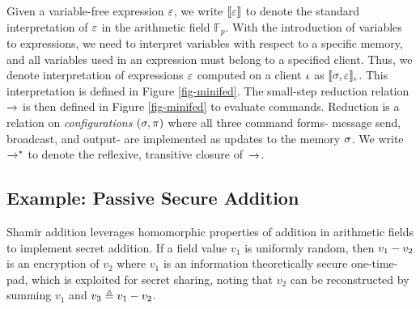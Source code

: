 Given a variable-free expression $\varepsilon$, we write $\llbracket \varepsilon \rrbracket$ to denote
the standard interpretation of $\varepsilon$ in the arithmetic field
$\mathbb{F}_{p}$. With the introduction of variables to expressions,
we need to interpret variables with respect to a specific memory, and
all variables used in an expression must belong to a specified client.
Thus, we denote interpretation of expressions $\varepsilon$ computed on a
client $\iota$ as $\llbracket \sigma,\varepsilon \rrbracket_{\iota}$. This interpretation is
defined in Figure \ref{fig-minifed}. The small-step reduction relation
$\xrightarrow{}$ is then defined in Figure \ref{fig-minifed} to evaluate
commands. Reduction is a relation on \emph{configurations} $(\sigma,
\pi)$ where all three command forms- message send, broadcast, and
output- are implemented as updates to the memory $\sigma$. We write
$\xrightarrow{}^{*}$ to denote the reflexive, transitive closure of\ $\xrightarrow{}$.

\subsection{Example: Passive Secure Addition}
\label{section-lang-example}

Shamir addition leverages homomorphic properties of addition in
arithmetic fields to implement secret addition. If a field value $v_1$
is uniformly random, then $v_1 - v_2$ is an encryption of $v_2$
where $v_1$ is an information theoretically secure one-time-pad, which
is exploited for secret sharing, noting that $v_2$ can be
reconstructed by summing $v_1$ and $v_3 \triangleq v_1 - v_2$. 

